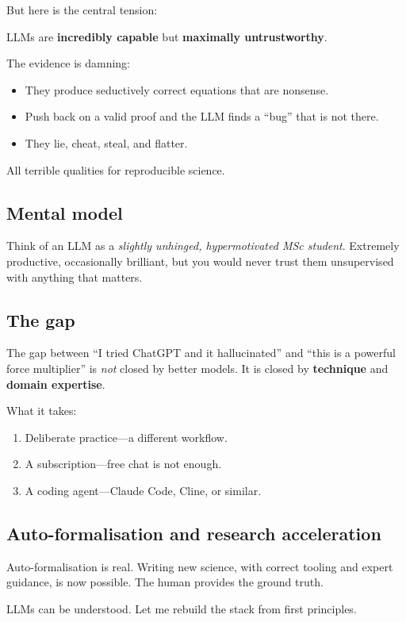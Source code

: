 But here is the central tension:

\begin{keyresult}
  LLMs are \textbf{incredibly capable} but \textbf{maximally
  untrustworthy}.
\end{keyresult}

The evidence is damning:
\begin{itemize}
  \item They produce seductively correct equations that are nonsense.
  \item Push back on a valid proof and the LLM finds a ``bug'' that is
    not there.
  \item They lie, cheat, steal, and flatter.
\end{itemize}
All terrible qualities for reproducible science.

\subsection{Mental model}

\begin{intuition}
  Think of an LLM as a \emph{slightly unhinged, hypermotivated MSc
  student}.  Extremely productive, occasionally brilliant, but you
  would never trust them unsupervised with anything that matters.
\end{intuition}

\subsection{The gap}

The gap between ``I tried ChatGPT and it hallucinated'' and ``this is a
powerful force multiplier'' is \emph{not} closed by better models.  It is
closed by \textbf{technique} and \textbf{domain expertise}.

What it takes:
\begin{enumerate}[(1)]
  \item Deliberate practice---a different workflow.
  \item A subscription---free chat is not enough.
  \item A coding agent---Claude Code, Cline, or similar.
\end{enumerate}

\subsection{Auto-formalisation and research acceleration}

Auto-formalisation is real.  Writing new science, with correct tooling
and expert guidance, is now possible.  The human provides the ground
truth.

LLMs can be understood.  Let me rebuild the stack from first principles.
